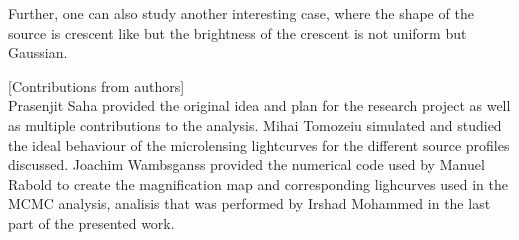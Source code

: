Further, one can also study another interesting case, where the shape of the source is crescent like but the brightness of the crescent is not uniform but Gaussian.






[Contributions from authors]\\
Prasenjit Saha provided the original idea and plan for the research project as well as multiple contributions to the analysis. Mihai Tomozeiu simulated and studied the ideal behaviour of the microlensing lightcurves for the different source profiles discussed. Joachim Wambsganss provided the numerical code used by Manuel Rabold to create the magnification map and corresponding lighcurves used in the MCMC analysis, analisis that was performed by Irshad Mohammed in the last part of the presented work. 
